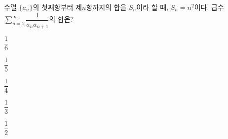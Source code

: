수열 $\{a_n\}$의 첫째항부터 제$n$항까지의 합을 $S_n$이라 할 때, $S_n=n^2$이다. 급수 $\displaystyle\sum_{n=1}^{\infty} \dfrac{1}{a_na_{n+1}}$의 합은?
\begin{choices32}{\rule[-3ex]{0pt}{8ex}$\dfrac{1}{6}$}{\rule[-3ex]{0pt}{8ex}$\dfrac{1}{5}$}{\rule[-3ex]{0pt}{8ex}$\dfrac{1}{4}$}{\rule[-3ex]{0pt}{8ex}$\dfrac{1}{3}$}{\rule[-3ex]{0pt}{8ex}$\dfrac{1}{2}$}\end{choices32}
